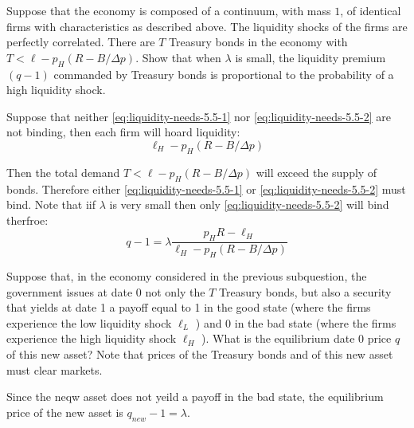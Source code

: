 \documentclass[12pt]{article}
\begin{document}
\begin{subexercise}
    Suppose that the economy is composed of a continuum, with mass $1$, of identical firms with characteristics as described above.
    The liquidity shocks of the firms are perfectly correlated. There are $T$ Treasury bonds in the economy with
    $T<\ell-p_H(R-B / \Delta p)$. Show that when $\lambda$ is small, the liquidity premium $(q-1)$ commanded by Treasury bonds is proportional
to the probability of a high liquidity shock.
\end{subexercise}

\begin{answer}
    Suppose that neither \eqref{eq:liquidity-needs-5.5-1} nor \eqref{eq:liquidity-needs-5.5-2} are not binding, then each firm will hoard liquidity:
    $$\ell_H - p_H(R - B/\Delta p)$$ 

    Then the total demand $T<\ell-p_H(R-B / \Delta p)$ will exceed the supply of bonds. Therefore either \eqref{eq:liquidity-needs-5.5-1} or \eqref{eq:liquidity-needs-5.5-2} must bind. Note that iif $\lambda$ is very small then only \eqref{eq:liquidity-needs-5.5-2} will bind therfroe:
    $$q  - 1 = \lambda \frac{p_H R - \ell_H}{\ell_H - p_H(R - B/\Delta p)}$$
\end{answer}

\begin{subexercise}
    Suppose that, in the economy considered in the previous subquestion, the government issues at date 0 not only the $T$ Treasury bonds, but also a security that yields at date 1 a payoff equal to 1 in the good state (where the firms experience the low liquidity shock $\ell_{L}$ ) and 0 in the bad state (where the firms experience the high liquidity shock $\ell_{H}$ ). What is the equilibrium date 0 price $q$ of this new asset? Note that prices of the Treasury bonds and of this new asset must clear markets.
\end{subexercise}

\begin{answer}
    Since the neqw asset does not yeild a payoff in the bad state, the equilibrium price of the new asset is $q_{new}-1 = \lambda$.
\end{answer}
\end{document}
